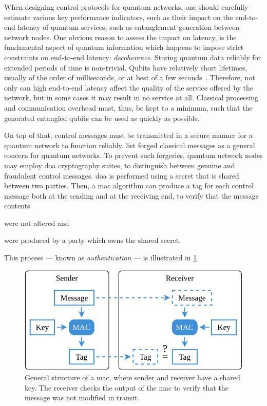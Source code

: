 When designing control protocols for quantum networks, one should carefully estimate various key
performance indicators, such as their impact on the end-to-end latency of quantum services, such as
entanglement generation between network nodes. One obvious reason to assess the impact on latency,
is the fundamental aspect of quantum information which happens to impose strict constraints on
end-to-end latency: \emph{decoherence}. Storing quantum data reliably for extended periods of time
is non-trivial. Qubits have relatively short lifetimes, usually of the order of milliseconds, or at
best of a few seconds~\cite{abobeih_2018_one_sec, bradley_2019_one_min}. Therefore, not only can
high end-to-end latency affect the quality of the service offered by the network, but in some cases
it may result in no service at all. Classical processing and communication overhead must, thus, be
kept to a minimum, such that the generated entangled qubits can be used as quickly as possible.

On top of that, control messages must be transmitted in a secure manner for a quantum network to
function reliably. \textcite{satoh_2020_attacking} list forged classical messages as a general
concern for quantum networks. To prevent such forgeries, quantum network nodes may employ
\acrfull{doa} cryptography suites, to distinguish between genuine and fraudulent control messages.
\acrshort{doa} is performed using a secret that is shared between two parties. Then, a \acrfull{mac}
algorithm can produce a tag for each control message both at the sending and at the receiving end,
to verify that the message contents
%
\begin{inlinelist}
    \item were not altered and
    \item were produced by a party which owns the shared secret.
\end{inlinelist}
This process --- known as \emph{authentication} --- is illustrated in \cref{fig:mac-structure}.

\begin{figure}[t]
    \centering
    \includegraphics[width=0.6\linewidth]{figures/mac-structure.pdf}
    \caption{
        General structure of a \acrfull{mac}, where sender and receiver have a shared key. The
        receiver checks the output of the \acrshort{mac} to verify that the message was not modified
        in transit.
    }
    \label{fig:mac-structure}
\end{figure}

